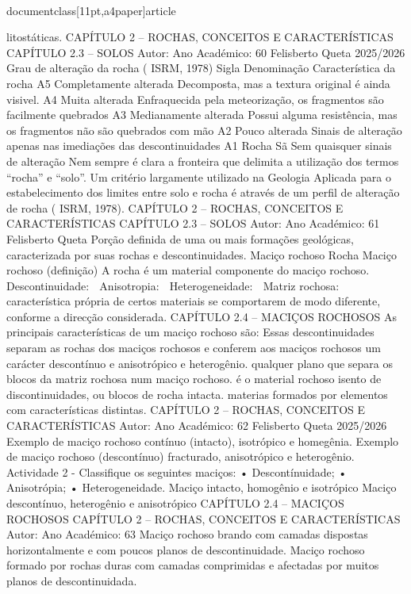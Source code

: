 \\documentclass[11pt,a4paper]{article}
\begin{document}
litostáticas. 
CAPÍTULO 2 
–
 ROCHAS, CONCEITOS E CARACTERÍSTICAS
CAPÍTULO 2.3 – SOLOS 
Autor:
Ano Académico:
60
Felisberto Queta
2025/2026
Grau de alteração da rocha ( ISRM, 1978)
Sigla Denominação Característica da rocha
A5 Completamente
alterada Decomposta, mas a textura original é ainda visivel. 
A4 Muita alterada Enfraquecida pela meteorização, os fragmentos são 
facilmente quebrados
A3
Medianamente
alterada
Possui alguma resistência, mas os fragmentos não 
são quebrados com mão
A2 Pouco alterada Sinais de alteração apenas nas imediações das 
descontinuidades
A1 Rocha Sã Sem quaisquer sinais de alteração
Nem sempre é clara a fronteira que delimita a utilização dos termos “rocha” e “solo”.
Um critério largamente utilizado na Geologia Aplicada para o estabelecimento dos limites entre 
solo e rocha é através de um perfil de alteração de rocha ( ISRM, 1978). 
CAPÍTULO 2 
–
 ROCHAS, CONCEITOS E CARACTERÍSTICAS
CAPÍTULO 2.3 – SOLOS 
Autor:
Ano Académico:
61
Felisberto Queta
Porção definida de uma ou mais 
formações geológicas, caracterizada 
por suas rochas e descontinuidades.
Maciço rochoso
Rocha
Maciço rochoso (definição)
A rocha é um material
componente do maciço
rochoso.
 Descontinuidade:
 Anisotropia:
 Heterogeneidade:
 Matriz rochosa:
característica própria de certos materiais se comportarem de modo 
diferente, conforme a direcção considerada.
CAPÍTULO 2.4 – MACIÇOS ROCHOSOS 
As principais características de um
maciço rochoso são:
Essas descontinuidades separam as 
rochas dos maciços rochosos e 
conferem aos maciços rochosos um 
carácter descontínuo e anisotrópico e 
heterogênio.
qualquer plano que separa os blocos da matriz rochosa num maciço rochoso.
é o material rochoso isento de discontinuidades, ou blocos de rocha intacta.
materias formados por elementos com características distintas.
CAPÍTULO 2 
–
 ROCHAS, CONCEITOS E CARACTERÍSTICAS
Autor:
Ano Académico:
62
Felisberto Queta
2025/2026
Exemplo de maciço rochoso contínuo (intacto), 
isotrópico e homegênia.
Exemplo de maciço rochoso (descontínuo) 
fracturado, anisotrópico e heterogênio.
Actividade 2 - Classifique 
os seguintes maciços:
• Descontínuidade;
• Anisotrópia;
• Heterogeneidade.
Maciço intacto, 
homogênio e 
isotrópico
Maciço 
descontínuo, 
heterogênio e 
anisotrópico
CAPÍTULO 2.4 – MACIÇOS ROCHOSOS 
CAPÍTULO 2 
–
 ROCHAS, CONCEITOS E CARACTERÍSTICAS
Autor:
Ano Académico:
63
Maciço rochoso brando com camadas dispostas 
horizontalmente e com poucos planos de 
descontinuidade.
Maciço rochoso formado por rochas duras com 
camadas comprimidas e afectadas por muitos 
planos de descontinuidada.
\end{document}

